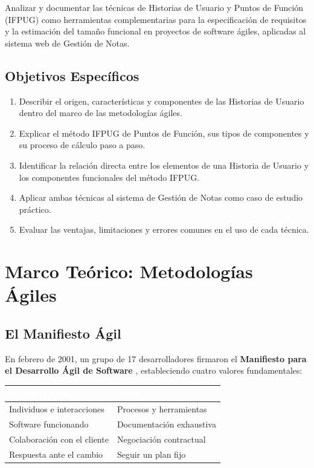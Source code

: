 \documentclass[12pt, a4paper]{article}
\begin{document}
Analizar y documentar las técnicas de Historias de Usuario y Puntos de Función
(IFPUG) como herramientas complementarias para la especificación de requisitos
y la estimación del tamaño funcional en proyectos de software ágiles, aplicadas
al sistema web de Gestión de Notas.

\subsection{Objetivos Específicos}

\begin{enumerate}[leftmargin=1.8cm, itemsep=3pt]
  \item Describir el origen, características y componentes de las Historias de
        Usuario dentro del marco de las metodologías ágiles.
  \item Explicar el método IFPUG de Puntos de Función, sus tipos de componentes
        y su proceso de cálculo paso a paso.
  \item Identificar la relación directa entre los elementos de una Historia de
        Usuario y los componentes funcionales del método IFPUG.
  \item Aplicar ambas técnicas al sistema de Gestión de Notas como caso de
        estudio práctico.
  \item Evaluar las ventajas, limitaciones y errores comunes en el uso de cada
        técnica.
\end{enumerate}

\section{Marco Teórico: Metodologías Ágiles}

\subsection{El Manifiesto Ágil}

En febrero de 2001, un grupo de 17 desarrolladores firmaron el
\textbf{Manifiesto para el Desarrollo Ágil de Software}
\parencite{beck2001}, estableciendo cuatro valores fundamentales:

\vspace{0.3cm}
\begin{tabular}{p{6cm} p{6cm}}
  \toprule
  \rowcolor{espeazul}
  \textcolor{white}{\textbf{Se valora más\ldots}} &
  \textcolor{white}{\textbf{\ldots que}} \\
  \midrule
  Individuos e interacciones & Procesos y herramientas \\
  Software funcionando       & Documentación exhaustiva \\
  Colaboración con el cliente & Negociación contractual \\
  Respuesta ante el cambio   & Seguir un plan fijo \\
  \bottomrule
\end{tabular}
\end{document}
